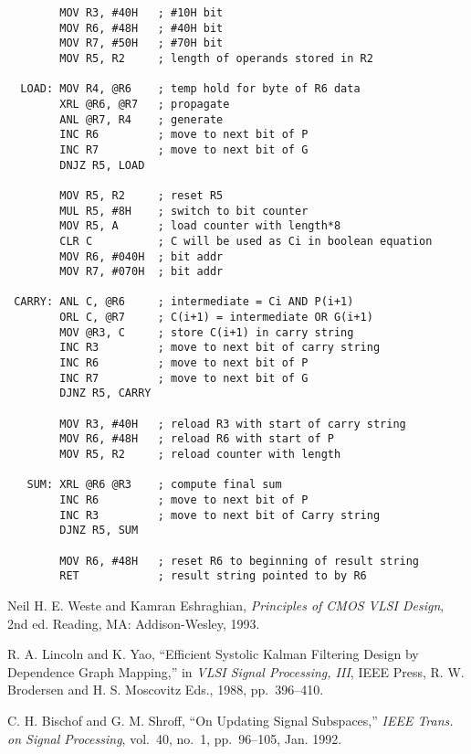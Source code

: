 \documentclass[journal]{IEEEtran}
\begin{document}
\begin{verbatim}
        MOV R3, #40H   ; #10H bit
        MOV R6, #48H   ; #40H bit
        MOV R7, #50H   ; #70H bit
        MOV R5, R2     ; length of operands stored in R2

  LOAD: MOV R4, @R6    ; temp hold for byte of R6 data
        XRL @R6, @R7   ; propagate
        ANL @R7, R4    ; generate
        INC R6         ; move to next bit of P
        INC R7         ; move to next bit of G
        DNJZ R5, LOAD

        MOV R5, R2     ; reset R5
        MUL R5, #8H    ; switch to bit counter
        MOV R5, A      ; load counter with length*8
        CLR C          ; C will be used as Ci in boolean equation
        MOV R6, #040H  ; bit addr
        MOV R7, #070H  ; bit addr

 CARRY: ANL C, @R6     ; intermediate = Ci AND P(i+1)
        ORL C, @R7     ; C(i+1) = intermediate OR G(i+1)
        MOV @R3, C     ; store C(i+1) in carry string
        INC R3         ; move to next bit of carry string
        INC R6         ; move to next bit of P
        INC R7         ; move to next bit of G
        DJNZ R5, CARRY

        MOV R3, #40H   ; reload R3 with start of carry string
        MOV R6, #48H   ; reload R6 with start of P
        MOV R5, R2     ; reload counter with length

   SUM: XRL @R6 @R3    ; compute final sum
        INC R6         ; move to next bit of P
        INC R3         ; move to next bit of Carry string
        DJNZ R5, SUM

        MOV R6, #48H   ; reset R6 to beginning of result string
        RET            ; result string pointed to by R6
\end{verbatim}



\begin{thebibliography}{99}

   Neil H. E. Weste and Kamran Eshraghian, {\it Principles
  of CMOS VLSI Design}, 2nd ed. Reading, MA: Addison-Wesley, 1993.

   R. A. Lincoln and K. Yao, ``Efficient Systolic Kalman
  Filtering Design by Dependence Graph Mapping,'' in {\it VLSI Signal
  Processing, III}, IEEE Press, R. W. Brodersen and H. S. Moscovitz Eds.,
  1988, pp.~396--410.

   C. H. Bischof and G. M. Shroff, ``On Updating Signal
  Subspaces,'' {\it IEEE Trans. on Signal Processing}, vol.~40, no.~1,
  pp.~96--105, Jan. 1992.

\end{thebibliography}
\end{document}
